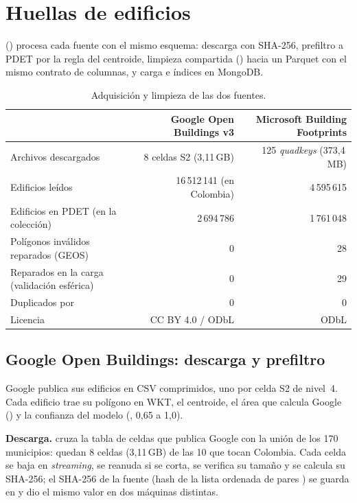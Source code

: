 \section{Huellas de edificios}
\label{sec:edificios}

 () procesa cada fuente
con el mismo esquema: descarga con SHA-256, prefiltro a PDET por la regla del
centroide, limpieza compartida () hacia un Parquet con el
mismo contrato de columnas, y carga e índices en MongoDB.

\begin{table}[H]
  \centering\small
  \caption{Adquisición y limpieza de las dos fuentes.}
  \label{tab:edif-resumen}
  \begin{tabularx}{\textwidth}{@{}L r r@{}}
    \toprule
    & \textbf{Google Open Buildings v3} & \textbf{Microsoft Building Footprints} \\
    \midrule
    Archivos descargados & 8 celdas S2 (3,11\,GB) & 125 \emph{quadkeys} (373,4\,MB) \\
    Edificios leídos & 16\,512\,141 (en Colombia) & 4\,595\,615 \\
    Edificios en PDET (en la colección) & 2\,694\,786 & 1\,761\,048 \\
    Polígonos inválidos reparados (GEOS) & 0 & 28 \\
    Reparados en la carga (validación esférica) & 0 & 29 \\
    Duplicados por  & 0 & 0 \\
    Licencia & CC BY 4.0 / ODbL & ODbL \\
    \bottomrule
  \end{tabularx}
\end{table}

\subsection{Google Open Buildings: descarga y prefiltro}
\label{sec:google}

Google publica sus edificios en CSV comprimidos, uno por celda S2 de nivel~4.
Cada edificio trae su polígono en WKT, el centroide, el área que calcula
Google () y la confianza del modelo
(, 0,65 a 1,0).

\textbf{Descarga.}  cruza la tabla de celdas que
publica Google con la unión de los 170 municipios: quedan 8 celdas (3,11\,GB)
de las 10 que tocan Colombia. Cada celda se baja en \emph{streaming}, se
reanuda si se corta, se verifica su tamaño y se calcula su SHA-256; el SHA-256
de la fuente (hash de la lista ordenada de pares ) se
guarda en  y dio el mismo valor en dos máquinas distintas.

